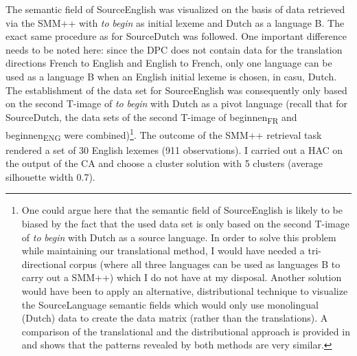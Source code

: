 The semantic field of SourceEnglish was visualized on the basis of data retrieved via the SMM++ with \textit{to} \textit{begin} as initial lexeme and Dutch as a language B. The exact same procedure as for SourceDutch was followed. One important difference needs to be noted here: since the DPC does not contain data for the translation directions French to English and English to French, only one language can be used as a language B when an English initial lexeme is chosen, in casu, Dutch. The establishment of the data set for SourceEnglish was consequently only based on the second T-image of \textit{to} \textit{begin} with Dutch as a pivot language (recall that for SourceDutch, the data sets of the second T-image of beginnen\textsubscript{FR} and beginnen\textsubscript{ENG} were combined)\footnote{One could argue here that the semantic field of SourceEnglish is likely to be biased by the fact that the used data set is only based on the second T-image of \textit{to} \textit{begin} with Dutch as a source language. In order to solve this problem while maintaining our translational method, I would have needed a tri-directional corpus (where all three languages can be used as languages B to carry out a SMM++) which I do not have at my disposal. Another solution would have been to apply an alternative, distributional technique to visualize the SourceLanguage semantic fields which would only use monolingual (Dutch) data to create the data matrix (rather than the translations). A comparison of the translational and the distributional approach is provided in \citet{vandevoorde_distributional_2016} and shows that the patterns revealed by both methods are very similar.}. The outcome of the SMM++ retrieval task rendered a set of 30 English lexemes (911 observations). I carried out a HAC on the output of the CA and choose a cluster solution with 5 clusters (average silhouette width 0.7).

